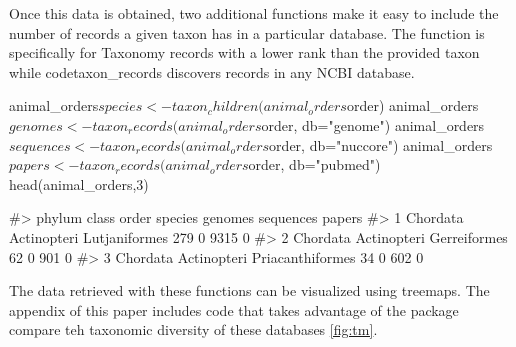 Once this data is obtained, two additional functions make it easy to include the
number of records a given taxon has in a particular database. The function
 is specifically for Taxonomy records with a lower rank than the
provided taxon while code{taxon\_records} discovers records in any NCBI database.


\begin{example}
animal_orders$species <- taxon_children(animal_orders$order)
animal_orders$genomes <- taxon_records(animal_orders$order, db="genome")
animal_orders$sequences <- taxon_records(animal_orders$order, db="nuccore")
animal_orders$papers <- taxon_records(animal_orders$order, db="pubmed")
head(animal_orders,3)

#>     phylum       class            order species genomes sequences papers
#> 1 Chordata Actinopteri    Lutjaniformes     279       0      9315      0
#> 2 Chordata Actinopteri     Gerreiformes      62       0       901      0
#> 3 Chordata Actinopteri Priacanthiformes      34       0       602      0
\end{example}

The data retrieved with these functions can be visualized using treemaps. The
appendix of this paper includes code that takes advantage of the
 \citep{treemap} package compare teh taxonomic diversity of 
these databases \ref{fig:tm}.


